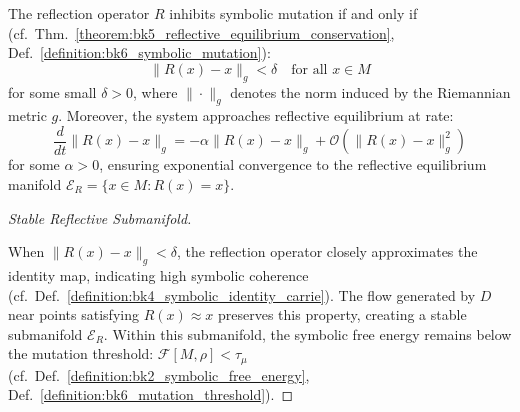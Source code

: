 \begin{proposition}
\label{proposition:bk6_reflective_mutation_inhibition}
The reflection operator $R$ inhibits symbolic mutation if and only if (cf.~Thm.~\ref{theorem:bk5_reflective_equilibrium_conservation}, Def.~\ref{definition:bk6_symbolic_mutation}):
\begin{equation}
\| R(x) - x \|_g < \delta \quad \text{for all } x \in M
\end{equation}
for some small $\delta > 0$, where $\|\cdot\|_g$ denotes the norm induced by the Riemannian metric $g$.
Moreover, the system approaches reflective equilibrium at rate:
\begin{equation}
\frac{d}{dt}\|R(x) - x\|_g = -\alpha \|R(x) - x\|_g + \mathcal{O}(\|R(x) - x\|_g^2)
\end{equation}
for some $\alpha > 0$, ensuring exponential convergence to the reflective equilibrium manifold $\mathcal{E}_R = \{x \in M : R(x) = x\}$.
\begin{proof}[Stable Reflective Submanifold]
\label{proof:bk6_stable_reflective_submanifold}
\leavevmode

When $\|R(x) - x\|_g < \delta$, the reflection operator closely approximates the identity map, indicating high symbolic coherence (cf.~Def.~\ref{definition:bk4_symbolic_identity_carrie}). The flow generated by $D$ near points satisfying $R(x) \approx x$ preserves this property, creating a stable submanifold $\mathcal{E}_R$. Within this submanifold, the symbolic free energy remains below the mutation threshold: $\mathcal{F}[M, \rho] < \tau_\mu$ (cf.~Def.~\ref{definition:bk2_symbolic_free_energy}, Def.~\ref{definition:bk6_mutation_threshold}).
\end{proof}
\end{proposition}
